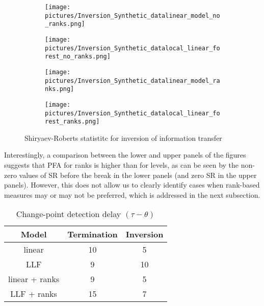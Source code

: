 \begin{figure}[H]
     \begin{subfigure}[b]{0.5\textwidth}
         \centering
         \texttt{[image: pictures/Inversion\_Synthetic\_datalinear\_model\_no\_ranks.png]}
     \end{subfigure}
     \hfill
     \begin{subfigure}[b]{0.5\textwidth}
         \centering
         \texttt{[image: pictures/Inversion\_Synthetic\_datalocal\_linear\_forest\_no\_ranks.png]}

     \end{subfigure}
     \vfill
     \begin{subfigure}[b]{0.5\textwidth}
         \centering
         \texttt{[image: pictures/Inversion\_Synthetic\_datalinear\_model\_ranks.png]}
     \end{subfigure}
    \hfill
     \begin{subfigure}[b]{0.5\textwidth}
         \centering
         \texttt{[image: pictures/Inversion\_Synthetic\_datalocal\_linear\_forest\_ranks.png]}
     \end{subfigure}
        \caption{Shiryaev-Roberts statistitc for inversion of information transfer}
        \label{fig:SR_inversion}
\end{figure}


Interestingly, a comparison between the lower and upper panels of the figures suggests that PFA for ranks is higher than for levels, as can be seen by the non-zero values of SR before the break in the lower panels (and zero SR in the upper panels). However, this does not allow us to clearly identify cases when rank-based measures may or may not be preferred, which is addressed in the next subsection.



\begin{table}[H]
    \centering
     \begin{tabular}{c | c c} 
     Model & Termination & Inversion  \\ [0.5ex] 
     \hline     linear & 10 & 5 \\ 
     LLF & 9 & 10  \\
     linear + ranks & 9 & 5  \\
     LLF + ranks & 15 & 7  \\
     \end{tabular}
     \caption{Change-point detection delay $(\tau - \theta)$}
     \label{tab:detection_delay}
\end{table}




